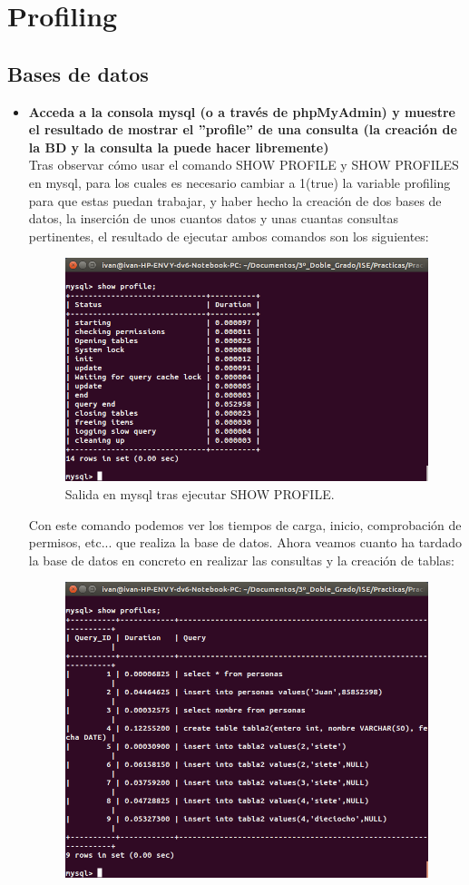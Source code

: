 \section{Profiling}

\subsection{Bases de datos}

\begin{itemize}
	\item \textbf{Acceda a la consola mysql (o a través de phpMyAdmin) y muestre el
		resultado de mostrar el ”profile” de una consulta (la creación de la BD y la consulta la
		puede hacer libremente)}\\
	Tras observar cómo usar el comando SHOW PROFILE y SHOW PROFILES en mysql\cite{mysqlProfile,mysqlProfiles}, para los cuales es necesario cambiar a 1(true) la variable profiling para que estas puedan trabajar, y haber hecho la creación de dos bases de datos, la inserción de unos cuantos datos y unas cuantas consultas pertinentes, el resultado de ejecutar ambos comandos son los siguientes:\\
	\begin{figure}[H]
	\centering
	\includegraphics[width=0.7\linewidth]{mysqlProfile}
	\caption[mysqlProfile]{Salida en mysql tras ejecutar SHOW PROFILE.}
	\label{fig:mysqlProfile}
	\end{figure}
	Con este comando podemos ver los tiempos de carga, inicio, comprobación de permisos, etc... que realiza la base de datos. Ahora veamos cuanto ha tardado la base de datos en concreto en realizar las consultas y la creación de tablas:\\
	\begin{figure}[H]
	\centering
	\includegraphics[width=0.7\linewidth]{mysqlProfiles}

\end{figure}
\end{itemize}
